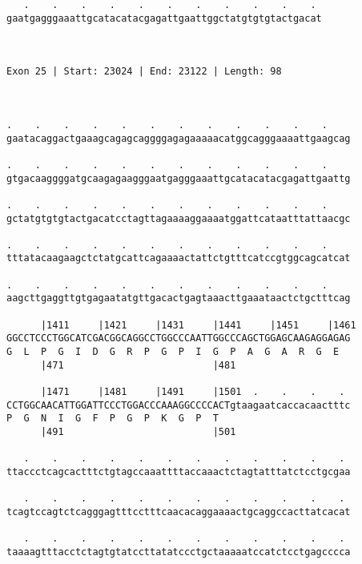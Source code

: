 \documentclass{article}
\begin{document}
\begin{Verbatim}
   .    .    .    .    .    .    .    .    .    .    . 
gaatgagggaaattgcatacatacgagattgaattggctatgtgtgtactgacat
                                                       
                                                       
 
Exon 25 | Start: 23024 | End: 23122 | Length: 98



.    .    .    .    .    .    .    .    .    .    .    .    
gaatacaggactgaaagcagagcaggggagagaaaaacatggcagggaaaattgaagcag
                                                            
.    .    .    .    .    .    .    .    .    .    .    .    
gtgacaaggggatgcaagagaagggaatgagggaaattgcatacatacgagattgaattg
                                                            
.    .    .    .    .    .    .    .    .    .    .    .    
gctatgtgtgtactgacatcctagttagaaaaggaaaatggattcataatttattaacgc
                                                            
.    .    .    .    .    .    .    .    .    .    .    .    
tttatacaagaagctctatgcattcagaaaactattctgtttcatccgtggcagcatcat
                                                            
.    .    .    .    .    .    .    .    .    .    .    .    
aagcttgaggttgtgagaatatgttgacactgagtaaacttgaaataactctgctttcag
                                                            
      |1411     |1421     |1431     |1441     |1451     |1461
GGCCTCCCTGGCATCGACGGCAGGCCTGGCCCAATTGGCCCAGCTGGAGCAAGAGGAGAG
G  L  P  G  I  D  G  R  P  G  P  I  G  P  A  G  A  R  G  E  
      |471                          |481                    
  
      |1471     |1481     |1491     |1501  .    .    .    . 
CCTGGCAACATTGGATTCCCTGGACCCAAAGGCCCCACTgtaagaatcaccacaactttc
P  G  N  I  G  F  P  G  P  K  G  P  T                       
      |491                          |501                    
  
   .    .    .    .    .    .    .    .    .    .    .    . 
ttaccctcagcactttctgtagccaaattttaccaaactctagtatttatctcctgcgaa
                                                            
   .    .    .    .    .    .    .    .    .    .    .    . 
tcagtccagtctcagggagtttcctttcaacacaggaaaactgcaggccacttatcacat
                                                            
   .    .    .    .    .    .    .    .    .    .    .    . 
taaaagtttacctctagtgtatccttatatccctgctaaaaatccatctcctgagcccca
                                                            

\end{Verbatim}
\end{document}
